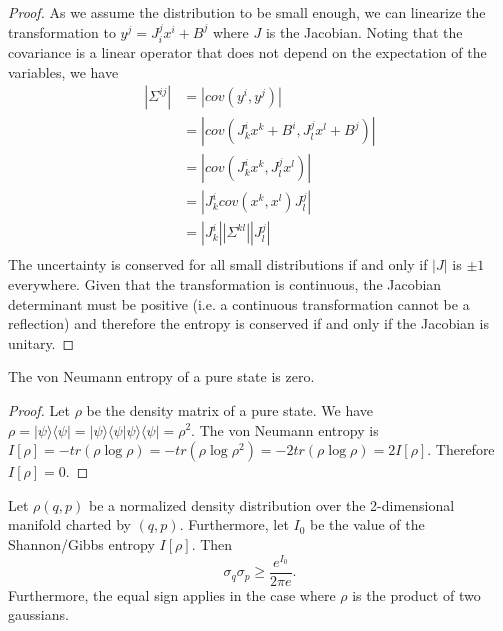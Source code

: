 \documentclass[10pt,twocolumn, nofootinbib]{revtex4-2}
\begin{document}
\begin{proof}
	As we assume the distribution to be small enough, we can linearize the transformation to $y^j = J^j_i x^i + B^j$ where $J$ is the Jacobian. Noting that the covariance is a linear operator that does not depend on the expectation of the variables, we have
	\begin{align*}
		|\Sigma^{ij}| &= |cov(y^i, y^j)| \\
		&= |cov(J^i_k x^k + B^i, J^j_l x^l + B^j)| \\
		&= |cov(J^i_k x^k , J^j_l x^l )| \\
		&= |J^i_k cov(x^k , x^l ) J^j_l| \\
		&= |J^i_k | | \Sigma^{kl} | | J^j_l| \\
	\end{align*}
	The uncertainty is conserved for all small distributions if and only if $|J|$ is $\pm 1$ everywhere. Given that the transformation is continuous, the Jacobian determinant must be positive (i.e. a continuous transformation cannot be a reflection) and therefore the entropy is conserved if and only if the Jacobian is unitary.
\end{proof}

\begin{prop}
	The von Neumann entropy of a pure state is zero.
\end{prop}

\begin{proof}
	Let $\rho$ be the density matrix of a pure state. We have $\rho = |\psi \rangle \langle \psi | = |\psi \rangle \langle \psi |\psi \rangle \langle \psi | = \rho^2$. The von Neumann entropy is $I[\rho] = - tr (\rho \log \rho) = - tr (\rho \log \rho^2) = - 2 tr (\rho \log \rho) = 2 I[\rho]$. Therefore $I[\rho] = 0$.
\end{proof}

\begin{prop}
	Let $\rho(q,p)$ be a normalized density distribution over the 2-dimensional manifold charted by $(q,p)$. Furthermore, let $I_0$ be the value of the Shannon/Gibbs entropy $I[\rho]$. Then
	$$ 	\sigma_q \sigma_p \geq \frac{e^{I_0}}{2 \pi e}.$$
	Furthermore, the equal sign applies in the case where $\rho$ is the product of two gaussians.
\end{prop}
\end{document}
